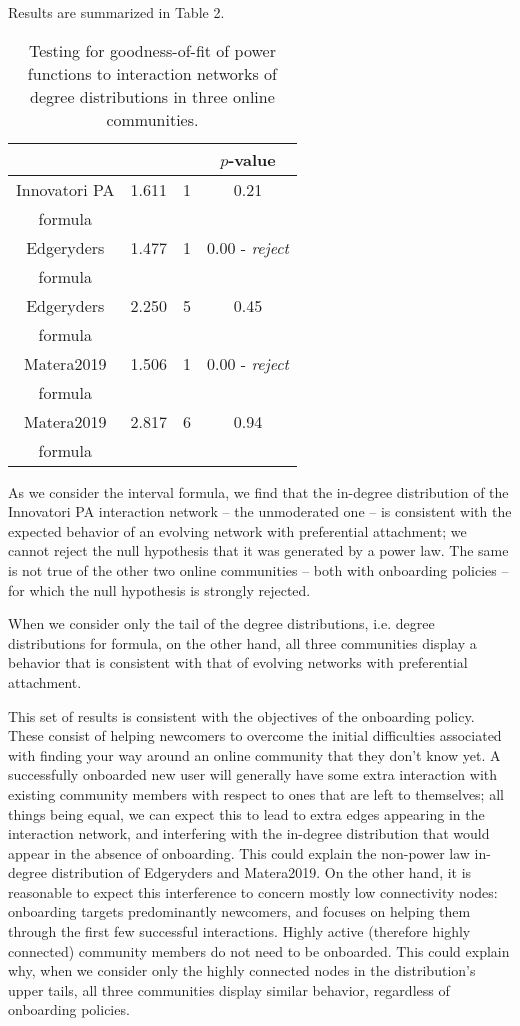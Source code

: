 Results are summarized in Table 2. 

\begin{table}
\centering 
\begin{tabular}{| c | c | c | c |} 
\hline 
&  &  & $p$-value\\ 
\hline 
Innovatori PA & 1.611 & 1 & 0.21 \\
formula & & & \\
\hline
Edgeryders & 1.477 & 1 & 0.00 - \emph{reject} \\
formula & & & \\
\hline
Edgeryders & 2.250 & 5 & 0.45 \\
formula & & & \\
\hline
Matera2019 & 1.506 & 1 & 0.00 - \emph{reject} \\
formula & & & \\
\hline
Matera2019 & 2.817 & 6 & 0.94 \\
formula & & & \\
\hline 
\end{tabular}
\caption{Testing for goodness-of-fit of power functions to interaction networks of degree distributions in three online communities.}
\label{tab:goodnessoffit}
\end{table}

As we consider the interval formula, we find that the in-degree distribution of the Innovatori PA interaction network – the unmoderated one – is consistent with the expected behavior of an evolving network with preferential attachment; we cannot reject the null hypothesis that it was generated by a power law. The same is not true of the other two online communities – both with onboarding policies – for which the null hypothesis is strongly rejected.  

When we consider only the tail of the degree distributions, i.e. degree distributions for formula, on the other hand, all three communities display a behavior that is consistent with that of evolving networks with preferential attachment.

This set of results is consistent with the objectives of the onboarding policy. These consist of helping newcomers to overcome the initial difficulties associated with finding your way around an online community that they don't know yet. A successfully onboarded new user will generally have some extra interaction with existing community members with respect to ones that are left to themselves; all things being equal, we can expect this to lead to extra edges appearing in the interaction network, and interfering with the in-degree distribution that would appear in the absence of onboarding. This could explain the non-power law in-degree distribution of Edgeryders and Matera2019. On the other hand, it is reasonable to expect this interference to concern mostly low connectivity nodes: onboarding targets predominantly newcomers, and focuses on helping them through the first few successful interactions. Highly active (therefore highly connected) community members do not need to be onboarded. This could explain why, when we consider only the highly connected nodes in the distribution's upper tails, all three communities display similar behavior, regardless of onboarding policies. 

